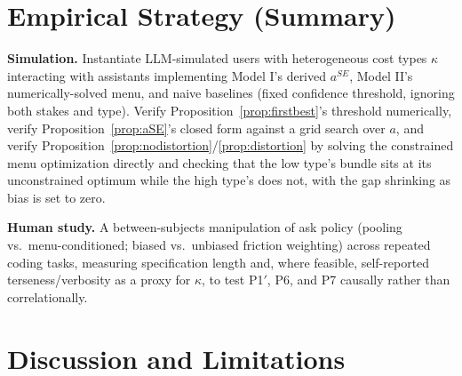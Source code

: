 \documentclass[11pt]{article}
\begin{document}
\section{Empirical Strategy (Summary)}

\textbf{Simulation.} Instantiate LLM-simulated users with heterogeneous cost
types $\kappa$ interacting with assistants implementing Model I's derived
$a^{SE}$, Model II's numerically-solved menu, and naive baselines (fixed
confidence threshold, ignoring both stakes and type). Verify
Proposition~\ref{prop:firstbest}'s threshold numerically, verify
Proposition~\ref{prop:aSE}'s closed form against a grid search over $a$, and
verify Proposition~\ref{prop:nodistortion}/\ref{prop:distortion} by solving the
constrained menu optimization directly and checking that the low type's bundle
sits at its unconstrained optimum while the high type's does not, with the gap
shrinking as bias is set to zero.

\textbf{Human study.} A between-subjects manipulation of ask policy (pooling vs.\
menu-conditioned; biased vs.\ unbiased friction weighting) across repeated coding
tasks, measuring specification length and, where feasible, self-reported
terseness/verbosity as a proxy for $\kappa$, to test P1$'$, P6, and P7 causally
rather than correlationally.

\section{Discussion and Limitations}
\label{sec:discussion}
\end{document}
